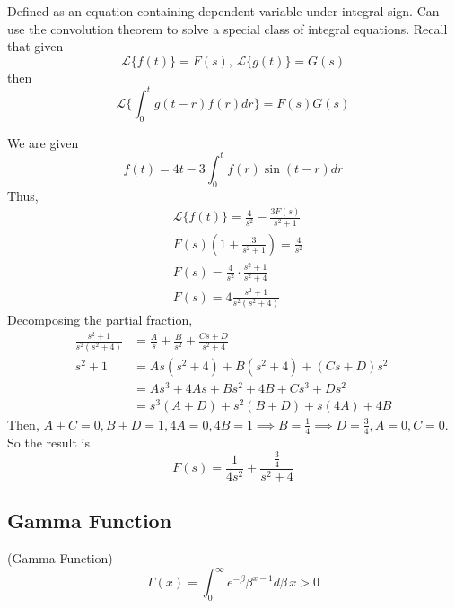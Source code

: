 Defined as an equation containing dependent variable under integral sign.
Can use the convolution theorem to solve a special class of integral equations.
Recall that given
\begin{equation}
    \mathcal{L}\{f(t)\}=F(s),\,\mathcal{L}\{g(t)\}=G(s)
\end{equation}
then
\begin{equation}
    \mathcal{L}\{\int_0^t g(t-r)f(r)dr\}=F(s)G(s)
\end{equation}

\begin{example}
    We are given
    \begin{equation*}
        f(t)=4t-3\int_0^t f(r)\sin (t-r) dr
    \end{equation*}
    Thus,
    \begin{align*}
        &\mathcal{L}\{f(t)\}=\frac{4}{s^2}-\frac{3F(s)}{s^2 + 1}\\
        &F(s)\left(1+\frac{3}{s^2+1}\right)=\frac{4}{s^2}\\
        &F(s)=\frac{4}{s^2}\cdot \frac{s^2+1}{s^2+4}\\
        &F(s)=4\frac{s^2+1}{s^2(s^2+4)}
    \end{align*}
    Decomposing the partial fraction,
    \begin{align*}
        \frac{s^2+1}{s^2(s^2+4)}&=\frac{A}{s}+\frac{B}{s^2}+\frac{Cs+D}{s^2+4}\\
        s^2+1&=As(s^2+4)+B(s^2+4)+(Cs+D)s^2\\
        &=As^3+4As+Bs^2+4B+Cs^3+Ds^2\\
        &=s^3(A+D)+s^2(B+D)+s(4A)+4B
    \end{align*}
    Then, $A+C=0,B+D=1,4A=0,4B=1\implies B=\frac{1}{4}\implies D=\frac{3}{4},A=0,C=0$.
    So the result is
    \begin{equation*}
        F(s)=\frac{1}{4s^2}+\frac{\frac{3}{4}}{s^2+4}
    \end{equation*}
\end{example}

\subsection{Gamma Function}

\begin{definition}(Gamma Function)
    \begin{equation}
        \Gamma(x)=\int_0^\infty e^{-\beta}\beta^{x-1}d\beta\,x>0
    \end{equation}
\end{definition}

